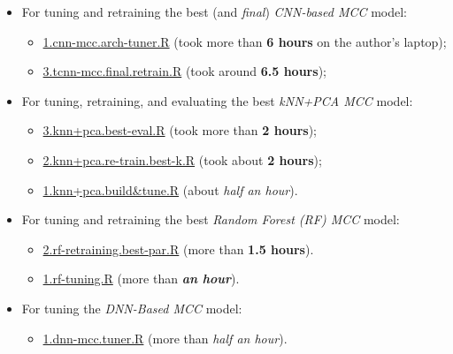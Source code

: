 \documentclass[
]{report}
\providecommand{\tightlist}{%
  \setlength{\itemsep}{0pt}\setlength{\parskip}{0pt}}
\begin{document}
\begin{itemize}
\item
  For tuning and retraining the best (and \emph{final}) \emph{CNN-based MCC} model:

  \begin{itemize}
  \tightlist
  \item
    \href{https://github.com/AzKurban-edX-DS/edx.capstone.choose-your-own/blob/main/r/models/cnn/mcc/tuner/1.cnn-mcc.arch-tuner.R}{1.cnn-mcc.arch-tuner.R} (took more than \textbf{6 hours} on the author's laptop);
  \item
    \href{https://github.com/AzKurban-edX-DS/edx.capstone.choose-your-own/blob/main/r/models/cnn/mcc/tuner/3.tcnn-mcc.final.retrain.R}{3.tcnn-mcc.final.retrain.R} (took around \textbf{6.5 hours});
  \end{itemize}
\item
  For tuning, retraining, and evaluating the best \emph{kNN+PCA MCC} model:

  \begin{itemize}
  \tightlist
  \item
    \href{https://github.com/AzKurban-edX-DS/edx.capstone.choose-your-own/blob/main/r/models/knn\%2Bpca-mcc/3.knn\%2Bpca.best-eval.R}{3.knn+pca.best-eval.R} (took more than \textbf{2 hours});
  \item
    \href{https://github.com/AzKurban-edX-DS/edx.capstone.choose-your-own/blob/main/r/models/knn\%2Bpca-mcc/2.knn\%2Bpca.re-train.best-k.R}{2.knn+pca.re-train.best-k.R} (took about \textbf{2 hours});
  \item
    \href{https://github.com/AzKurban-edX-DS/edx.capstone.choose-your-own/blob/main/r/models/knn\%2Bpca-mcc/1.knn\%2Bpca.build\%26tune.R}{1.knn+pca.build\&tune.R} (about \emph{half an hour}).
  \end{itemize}
\item
  For tuning and retraining the best \emph{Random Forest (RF) MCC} model:

  \begin{itemize}
  \tightlist
  \item
    \href{https://github.com/AzKurban-edX-DS/edx.capstone.choose-your-own/blob/main/r/models/rf-mcc/2.rf-retraining.best-par.R}{2.rf-retraining.best-par.R} (more than \textbf{1.5 hours}).
  \item
    \href{https://github.com/AzKurban-edX-DS/edx.capstone.choose-your-own/blob/main/r/models/rf-mcc/1.rf-tuning.R}{1.rf-tuning.R} (more than \textbf{\emph{an hour}}).
  \end{itemize}
\item
  For tuning the \emph{DNN-Based MCC} model:

  \begin{itemize}
  \tightlist
  \item
    \href{https://github.com/AzKurban-edX-DS/edx.capstone.choose-your-own/blob/main/r/models/dnn-mcc/tuner/1.dnn-mcc.tuner.R}{1.dnn-mcc.tuner.R} (more than \emph{half an hour}).
  \end{itemize}
\end{itemize}
\end{document}
